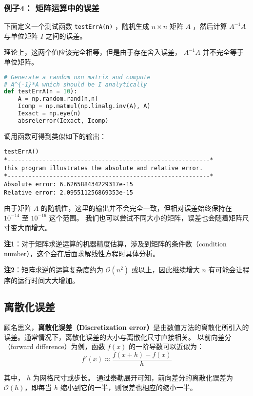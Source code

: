 \subsubsection{例子4： 矩阵运算中的误差}

下面定义一个测试函数 \verb|testErrA(n)| ，随机生成  $n\times n$  矩阵  $A$  ，然后计算  $A^{-1}A$  与单位矩阵  $I$  之间的误差。

理论上，这两个值应该完全相等，但是由于存在舍入误差， $A^{-1}A$ 并不完全等于单位矩阵。
\begin{lstlisting}[language=python]
# Generate a random nxn matrix and compute
# A^{-1}*A which should be I analytically
def testErrA(n = 10):
    A = np.random.rand(n,n)
    Icomp = np.matmul(np.linalg.inv(A), A)
    Iexact = np.eye(n)
    absrelerror(Iexact, Icomp)
\end{lstlisting}

调用函数可得到类似如下的输出：
\begin{lstlisting}[language={}]
testErrA()
*----------------------------------------------------------*
This program illustrates the absolute and relative error.
*----------------------------------------------------------*
Absolute error: 6.626588434229317e-15
Relative error: 2.095511256869353e-15
\end{lstlisting}

由于矩阵  $A$  的随机性，这里的输出并不会完全一致，但相对误差始终保持在 $10^{-14}$  至  $10^{-16}$  这个范围。 我们也可以尝试不同大小的矩阵，误差也会随着矩阵尺寸变大而增大。

\textbf{注1}：对于矩阵求逆运算的机器精度估算，涉及到矩阵的条件数（condition number），这个会在后面求解线性方程时具体分析。

\textbf{注2}：矩阵求逆的运算复杂度约为  $\mathcal{O}(n^2)$  或以上，因此继续增大  $n$  有可能会让程序的运行时间大大增加。

\subsection{离散化误差}

顾名思义，\textbf{离散化误差（Discretization error）}是由数值方法的离散化所引入的误差。通常情况下，离散化误差的大小与离散化尺寸直接相关。 以前向差分（forward difference）为例，函数  $f(x)$  的一阶导数可以近似为：
\begin{equation}
f'(x)\approx \frac{f(x+h)-f(x)}{h}
\end{equation}

其中，  $h$  为网格尺寸或步长。 通过泰勒展开可知，前向差分的离散化误差为 $\mathcal{O}(h)$，即每当 $h$ 缩小到它的一半，则误差也相应的缩小一半。

